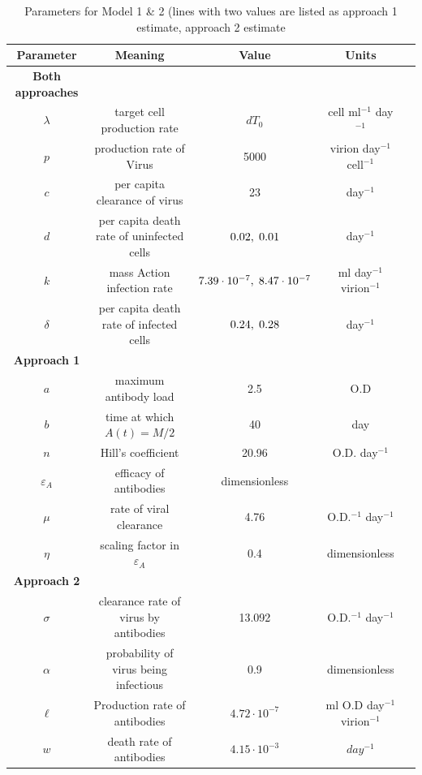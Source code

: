 \documentclass[]{elsarticle}
\theoremstyle{definition}
\begin{document}
\begin{center}
\begin{table}[H]
\scriptsize
\centering
\begin{tabular}{c c c c c}
Parameter & Meaning & Value& Units\\ \hline
\textbf{Both approaches} \\ \hline
$\lambda$ & target cell production rate & $dT_0$& cell ml$^{-1}$ day$^{-1}$  \\
$p$ & production rate of Virus & 5000&virion day$^{-1}$ cell$^{-1}$ \\
$c$ & per capita clearance of virus& 23& 	day$^{-1}$\\
$d$ & per capita death rate of uninfected cells & $0.02, \hspace{1mm} 0.01$ &  day$^{-1}$\\
$k$ & mass Action infection rate & $7.39 \cdot 10^{-7}, \hspace{1mm}8.47\cdot 10^{-7}$  & ml day$^{-1}$ virion$^{-1}$\\
$\delta$ & 	per capita death rate of infected cells & $0.24, \hspace{1mm }0.28$ & day$^{-1}$ \\


\textbf{Approach 1}\\ \hline
$a$ & maximum antibody load& 2.5& O.D\\
$b$ & time at which $A(t) = M/2$& 40& day \\
$n$ & Hill's coefficient & 20.96 & O.D. day$^{-1}$ \\
$\varepsilon_A$ & efficacy of antibodies & dimensionless\\
$\mu$ & rate of viral clearance & 4.76 & O.D.$^{-1}$ day$^{-1}$\\
$\eta$& scaling factor in $\varepsilon_A$& 0.4& dimensionless \\

\textbf{Approach 2}\\ \hline

$\sigma$ & clearance rate of virus by antibodies& 13.092& O.D.$^{-1}$ day$^{-1}$\\
$\alpha$ & probability of virus being infectious & 0.9& dimensionless \\
$\ell$&Production rate of antibodies& $4.72\cdot10^{-7}$& ml O.D day$^{-1}$ virion$^{-1}$ \\
$w$ & death rate of antibodies& $4.15\cdot10^{-3}$& $day^{-1}$\\
\end{tabular}
\caption{Parameters for Model 1 \& 2 (lines with two values are listed as approach 1 estimate, approach 2 estimate }
\label{table:ta}
\end{table}
\end{center}
\end{document}
